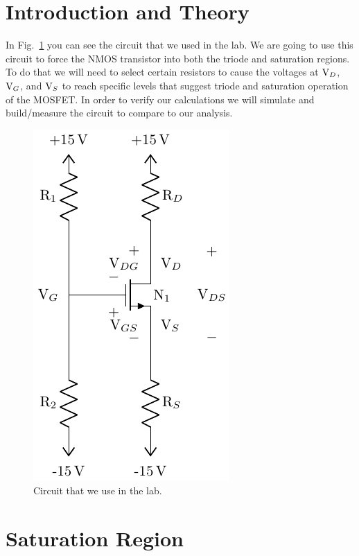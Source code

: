 \documentclass{../../ece-report}
\newcommand{\Vsub}[1]{\ensuremath{\textnormal{V}_{#1}}}
\begin{document}
\maketitle


\section{Introduction and Theory}

In Fig.~\ref{fig:circuit} you can see the circuit that
we used in the lab. We are going to use this circuit
to force the NMOS transistor into both the triode and
saturation regions. To do that we will need to select
certain resistors to cause the voltages at $\textnormal{V}_{D}$, \Vsub{G},
and \Vsub{S} to reach specific levels that suggest triode
and saturation operation of the MOSFET. In order to
verify our calculations we will simulate and build/measure
the circuit to compare to our analysis.

\begin{figure}[h!]
  \centering
  \includegraphics{circuits/circuit.pdf}
  \caption{Circuit that we use in the lab.}\label{fig:circuit}
\end{figure}

\section{Saturation Region}
\end{document}
